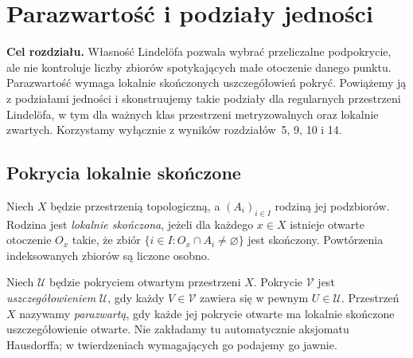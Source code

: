 \chapter{Parazwartość i podziały jedności}
\label{ch:topog-parazwartosc}

\noindent\textbf{Cel rozdziału.}
Własność Lindelöfa pozwala wybrać przeliczalne podpokrycie,
ale nie kontroluje liczby zbiorów spotykających małe otoczenie
danego punktu. Parazwartość wymaga lokalnie skończonych
uszczegółowień pokryć. Powiążemy ją z podziałami jedności
i skonstruujemy takie podziały dla regularnych przestrzeni
Lindelöfa, w tym dla ważnych klas przestrzeni metryzowalnych
oraz lokalnie zwartych. Korzystamy wyłącznie z wyników
rozdziałów~5, 9, 10 i 14.

\section{Pokrycia lokalnie skończone}
\label{sec:topog-parazwartosc-pokrycia}

\begin{definicja}
\label{def:topog-parazwartosc-lokalnie-skonczona}
Niech $X$ będzie przestrzenią topologiczną, a
$(A_i)_{i\in I}$ rodziną jej podzbiorów.
Rodzina jest \emph{lokalnie skończona}, jeżeli
dla każdego $x\in X$ istnieje otwarte otoczenie
$O_x$ takie, że zbiór
$\{i\in I:O_x\cap A_i\ne\varnothing\}$
jest skończony. Powtórzenia indeksowanych
zbiorów są liczone osobno.
\end{definicja}

\begin{definicja}
\label{def:topog-parazwartosc-definicja}
Niech $\mathcal U$ będzie pokryciem otwartym
przestrzeni $X$. Pokrycie $\mathcal V$ jest
\emph{uszczegółowieniem} $\mathcal U$, gdy
każdy $V\in\mathcal V$ zawiera się w pewnym
$U\in\mathcal U$. Przestrzeń $X$ nazywamy
\emph{parazwartą}, gdy każde jej pokrycie
otwarte ma lokalnie skończone uszczegółowienie
otwarte.
Nie zakładamy tu automatycznie
aksjomatu Hausdorffa; w twierdzeniach
wymagających go podajemy go jawnie.
\end{definicja}

